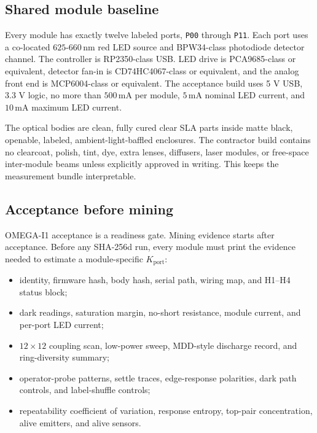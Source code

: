 \documentclass[11pt]{article}
\theoremstyle{definition}
\theoremstyle{remark}
\begin{document}
\subsection{Shared module baseline}

Every module has exactly twelve labeled ports, \texttt{P00} through
\texttt{P11}. Each port uses a co-located \(625\)-\(660\,\mathrm{nm}\) red LED
source and BPW34-class photodiode detector channel. The controller is
RP2350-class USB. LED drive is PCA9685-class or equivalent, detector fan-in is
CD74HC4067-class or equivalent, and the analog front end is MCP6004-class or
equivalent. The acceptance build uses 5 V USB,
3.3 V logic, no more than \(500\,\mathrm{mA}\) per module, \(5\,\mathrm{mA}\)
nominal LED current, and \(10\,\mathrm{mA}\) maximum LED current.

The optical bodies are clean, fully cured clear SLA parts inside matte black,
openable, labeled, ambient-light-baffled enclosures. The contractor build
contains no clearcoat, polish, tint, dye, extra lenses, diffusers, laser modules,
or free-space inter-module beams unless explicitly approved in writing. This
keeps the measurement bundle interpretable.

\subsection{Acceptance before mining}

OMEGA-I1 acceptance is a readiness gate. Mining evidence starts after
acceptance. Before any SHA-256d run, every module must print the evidence needed to estimate a
module-specific \(K_{\mathrm{port}}\):

\begin{itemize}
\item identity, firmware hash, body hash, serial path, wiring map, and H1--H4
status block;
\item dark readings, saturation margin, no-short resistance, module current,
and per-port LED current;
\item \(12\times12\) coupling scan, low-power sweep, MDD-style discharge
record, and ring-diversity summary;
\item operator-probe patterns, settle traces, edge-response polarities, dark
path controls, and label-shuffle controls;
\item repeatability coefficient of variation, response entropy, top-pair
concentration, alive emitters, and alive sensors.
\end{itemize}
\end{document}
